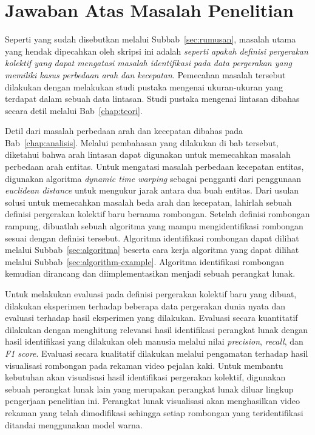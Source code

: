 \section{Jawaban Atas Masalah Penelitian}
\label{sec:jawaban-masalah}

Seperti yang sudah disebutkan melalui Subbab~\ref{sec:rumusan}, masalah utama yang hendak dipecahkan oleh skripsi ini adalah \textit{seperti apakah definisi pergerakan kolektif yang dapat mengatasi masalah identifikasi pada data pergerakan yang memiliki kasus perbedaan arah dan kecepatan}. Pemecahan masalah tersebut dilakukan dengan melakukan studi pustaka mengenai ukuran-ukuran yang terdapat dalam sebuah data lintasan. Studi pustaka mengenai lintasan dibahas secara detil melalui Bab~\ref{chap:teori}.

Detil dari masalah perbedaan arah dan kecepatan dibahas pada Bab~\ref{chap:analisis}. Melalui pembahasan yang dilakukan di bab tersebut, diketahui bahwa arah lintasan dapat digunakan untuk memecahkan masalah perbedaan arah entitas. Untuk mengatasi masalah perbedaan kecepatan entitas, digunakan algoritma \textit{dynamic time warping} sebagai pengganti dari penggunaan \textit{euclidean distance} untuk mengukur jarak antara dua buah entitas. Dari usulan solusi untuk memecahkan masalah beda arah dan kecepatan, lahirlah sebuah definisi pergerakan kolektif baru bernama rombongan. Setelah definisi rombongan rampung, dibuatlah sebuah algoritma yang mampu mengidentifikasi rombongan sesuai dengan definisi tersebut. Algoritma identifikasi rombongan dapat dilihat melalui Subbab~\ref{sec:algoritma} beserta cara kerja algoritma yang dapat dilihat melalui Subbab~\ref{sec:algorithm-example}. Algoritma identifikasi rombongan kemudian dirancang dan diimplementasikan menjadi sebuah perangkat lunak.

Untuk melakukan evaluasi pada definisi pergerakan kolektif baru yang dibuat, dilakukan eksperimen terhadap beberapa data pergerakan dunia nyata dan evaluasi terhadap hasil eksperimen yang dilakukan. Evaluasi secara kuantitatif dilakukan dengan menghitung relevansi hasil identifikasi perangkat lunak dengan hasil identifikasi yang dilakukan oleh manusia melalui nilai \textit{precision}, \textit{recall}, dan \textit{F1 score}. Evaluasi secara kualitatif dilakukan melalui pengamatan terhadap hasil visualisasi rombongan pada rekaman video pejalan kaki. Untuk membantu kebutuhan akan visualisasi hasil identifikasi pergerakan kolektif, digunakan sebuah perangkat lunak lain yang merupakan perangkat lunak diluar lingkup pengerjaan penelitian ini. Perangkat lunak visualisasi akan menghasilkan video rekaman yang telah dimodifikasi sehingga setiap rombongan yang teridentifikasi ditandai menggunakan model warna.

